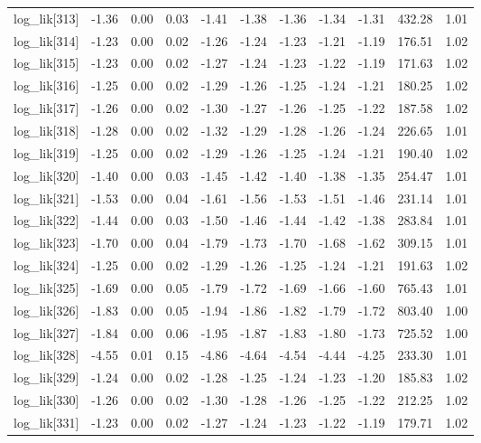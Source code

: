 \begin{table}[ht]
\begin{tabular}{rrrrrrrrrrr}
  log\_lik[313] & -1.36 & 0.00 & 0.03 & -1.41 & -1.38 & -1.36 & -1.34 & -1.31 & 432.28 & 1.01 \\ 
  log\_lik[314] & -1.23 & 0.00 & 0.02 & -1.26 & -1.24 & -1.23 & -1.21 & -1.19 & 176.51 & 1.02 \\ 
  log\_lik[315] & -1.23 & 0.00 & 0.02 & -1.27 & -1.24 & -1.23 & -1.22 & -1.19 & 171.63 & 1.02 \\ 
  log\_lik[316] & -1.25 & 0.00 & 0.02 & -1.29 & -1.26 & -1.25 & -1.24 & -1.21 & 180.25 & 1.02 \\ 
  log\_lik[317] & -1.26 & 0.00 & 0.02 & -1.30 & -1.27 & -1.26 & -1.25 & -1.22 & 187.58 & 1.02 \\ 
  log\_lik[318] & -1.28 & 0.00 & 0.02 & -1.32 & -1.29 & -1.28 & -1.26 & -1.24 & 226.65 & 1.01 \\ 
  log\_lik[319] & -1.25 & 0.00 & 0.02 & -1.29 & -1.26 & -1.25 & -1.24 & -1.21 & 190.40 & 1.02 \\ 
  log\_lik[320] & -1.40 & 0.00 & 0.03 & -1.45 & -1.42 & -1.40 & -1.38 & -1.35 & 254.47 & 1.01 \\ 
  log\_lik[321] & -1.53 & 0.00 & 0.04 & -1.61 & -1.56 & -1.53 & -1.51 & -1.46 & 231.14 & 1.01 \\ 
  log\_lik[322] & -1.44 & 0.00 & 0.03 & -1.50 & -1.46 & -1.44 & -1.42 & -1.38 & 283.84 & 1.01 \\ 
  log\_lik[323] & -1.70 & 0.00 & 0.04 & -1.79 & -1.73 & -1.70 & -1.68 & -1.62 & 309.15 & 1.01 \\ 
  log\_lik[324] & -1.25 & 0.00 & 0.02 & -1.29 & -1.26 & -1.25 & -1.24 & -1.21 & 191.63 & 1.02 \\ 
  log\_lik[325] & -1.69 & 0.00 & 0.05 & -1.79 & -1.72 & -1.69 & -1.66 & -1.60 & 765.43 & 1.01 \\ 
  log\_lik[326] & -1.83 & 0.00 & 0.05 & -1.94 & -1.86 & -1.82 & -1.79 & -1.72 & 803.40 & 1.00 \\ 
  log\_lik[327] & -1.84 & 0.00 & 0.06 & -1.95 & -1.87 & -1.83 & -1.80 & -1.73 & 725.52 & 1.00 \\ 
  log\_lik[328] & -4.55 & 0.01 & 0.15 & -4.86 & -4.64 & -4.54 & -4.44 & -4.25 & 233.30 & 1.01 \\ 
  log\_lik[329] & -1.24 & 0.00 & 0.02 & -1.28 & -1.25 & -1.24 & -1.23 & -1.20 & 185.83 & 1.02 \\ 
  log\_lik[330] & -1.26 & 0.00 & 0.02 & -1.30 & -1.28 & -1.26 & -1.25 & -1.22 & 212.25 & 1.02 \\ 
  log\_lik[331] & -1.23 & 0.00 & 0.02 & -1.27 & -1.24 & -1.23 & -1.22 & -1.19 & 179.71 & 1.02 \\ 

\end{tabular}
\end{table}
